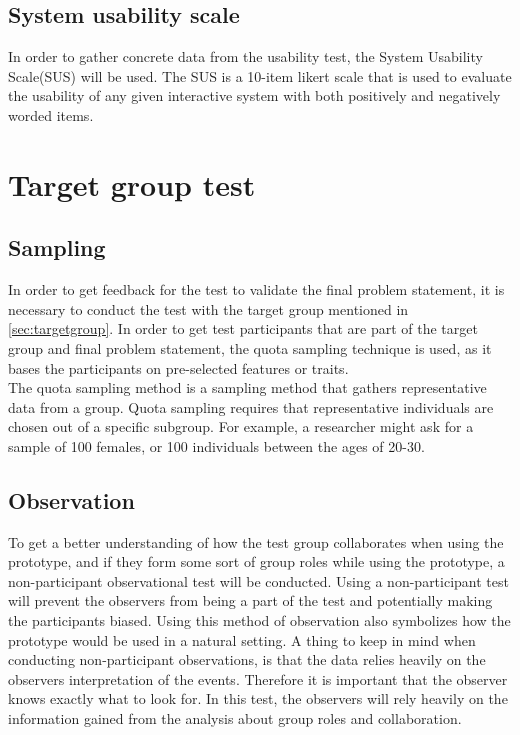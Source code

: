 \subsection{System usability scale}\label{sus}
In order to gather concrete data from the usability test, the System Usability Scale(SUS) will be used\cite{susScale}. The SUS is a 10-item likert scale that is used to evaluate the usability of any given interactive system with both positively and negatively worded items\cite{susScale}.

\section{Target group test}

\subsection{Sampling}
In order to get feedback for the test to validate the final problem statement, it is necessary to conduct the test with the target group mentioned in \autoref{sec:targetgroup}. In order to get test participants that are part of the target group and final problem statement, the quota sampling technique is used, as it bases the participants on pre-selected features or traits.\\

The quota sampling method is a sampling method that gathers representative data from a group\cite{quotaSamp}. Quota sampling requires that representative individuals are chosen out of a specific subgroup\cite{quotaSamp}. For example, a researcher might ask for a sample of 100 females, or 100 individuals between the ages of 20-30\cite{quotaSamp}.

\subsection{Observation}\label{sec:observationalTest}
To get a better understanding of how the test group collaborates when using the prototype, and if they form some sort of group roles while using the prototype, a non-participant observational test will be conducted\cite[p.~64-67]{bjoernerBog}. Using a non-participant test will prevent the observers from being a part of the test and potentially making the participants biased. Using this method of observation also symbolizes how the prototype would be used in a natural setting. A thing to keep in mind when conducting non-participant observations, is that the data relies heavily on the observers interpretation of the events. Therefore it is important that the observer knows exactly what to look for. In this test, the observers will rely heavily on the information gained from the analysis about group roles and collaboration\cite[p.~64-67]{bjoernerBog}.

